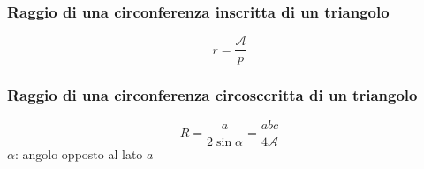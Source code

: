\subsubsection{Raggio di una circonferenza inscritta di un triangolo}
\begin{equation*}
  r = \frac{\mathscr{A}}{p}
\end{equation*}

\subsubsection{Raggio di una circonferenza circosccritta di un triangolo}
\begin{equation*}
  R = \frac{a}{2\sin\alpha} = \frac{abc}{4\mathscr{A}}
\end{equation*}
$\alpha$: angolo opposto al lato $a$

